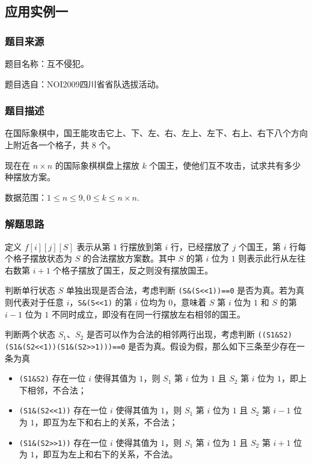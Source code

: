 \subsection{应用实例一}

\subsubsection{题目来源}

题目名称：互不侵犯。

题目选自：NOI2009四川省省队选拔活动。

\subsubsection{题目描述}

在国际象棋中，国王能攻击它上、下、左、右、左上、左下、右上、右下八个方向上附近各一个格子，共
\(8\) 个。

现在在 \(n\times n\) 的国际象棋棋盘上摆放 \(k\)
个国王，使他们互不攻击，试求共有多少种摆放方案。

数据范围：\(1\le n\le 9,0\le k\le n\times n\).

\subsubsection{解题思路}

定义 \(f[i][j][S]\) 表示从第 \(1\) 行摆放到第 \(i\) 行，已经摆放了 \(j\)
个国王，第 \(i\) 行每个格子摆放状态为 \(S\) 的合法摆放方案数。其中 \(S\)
的第 \(i\) 位为 \(1\) 则表示此行从左往右数第 \(i+1\)
个格子摆放了国王，反之则没有摆放国王。

判断单行状态 \(S\) 单独出现是否合法，考虑判断
\texttt{(S\&(S\textless{}\textless{}1))==0}
是否为真。若为真则代表对于任意
\(i\)，\texttt{S\&(S\textless{}\textless{}1)} 的第 \(i\) 位均为
\(0\)，意味着 \(S\) 第 \(i\) 位为 \(1\) 和 \(S\) 的第 \(i-1\) 位为 \(1\)
不同时成立，即没有在同一行摆放左右相邻的国王。

判断两个状态 \(S_1\)、\(S_2\) 是否可以作为合法的相邻两行出现，考虑判断
\texttt{((S1\&S2)\textbar{}\textbar{}(S1\&(S2\textless{}\textless{}1))\textbar{}\textbar{}(S1\&(S2\textgreater{}\textgreater{}1)))==0}
是否为真。假设为假，那么如下三条至少存在一条为真

\begin{itemize}
\tightlist
\item
  \texttt{(S1\&S2)} 存在一位 \(i\) 使得其值为 \(1\)，则 \(S_1\) 第 \(i\)
  位为 \(1\) 且 \(S_2\) 第 \(i\) 位为 \(1\)，即上下相邻，不合法；
\item
  \texttt{(S1\&(S2\textless{}\textless{}1))} 存在一位 \(i\) 使得其值为
  \(1\)，则 \(S_1\) 第 \(i\) 位为 \(1\) 且 \(S_2\) 第 \(i-1\) 位为
  \(1\)，即互为左下和右上的关系，不合法；
\item
  \texttt{(S1\&(S2\textgreater{}\textgreater{}1))} 存在一位 \(i\)
  使得其值为 \(1\)，则 \(S_1\) 第 \(i\) 位为 \(1\) 且 \(S_2\) 第 \(i+1\)
  位为 \(1\)，即互为左上和右下的关系，不合法。
\end{itemize}

